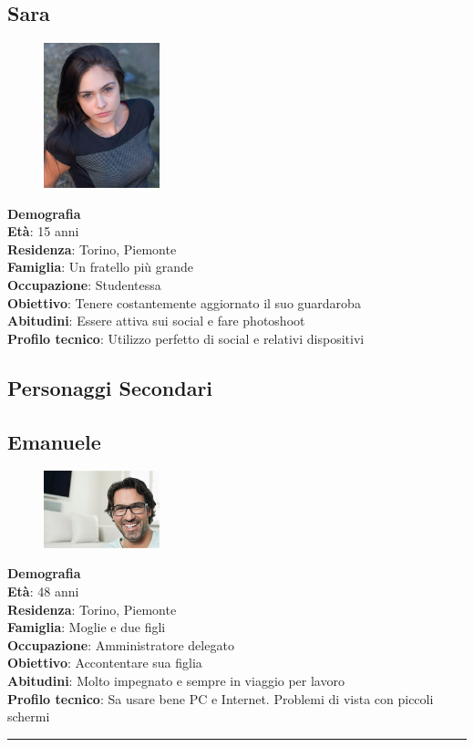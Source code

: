 \documentclass[12pt,a4paper]{report}
\begin{document}
\subsection*{Sara}
\begin{figure}
  \centering
  \includegraphics[width=0.3\textwidth]{"Images Latex/Personas/Sara"}
\end{figure}
\textbf{Demografia}\\
\indent\textbf{Età}: 15 anni\\
\indent\textbf{Residenza}: Torino, Piemonte\\
\indent\textbf{Famiglia}: Un fratello più grande\\
\indent\textbf{Occupazione}: Studentessa\\
\textbf{Obiettivo}: Tenere costantemente aggiornato il suo guardaroba\\
\textbf{Abitudini}: Essere attiva sui social e fare photoshoot\\
\textbf{Profilo tecnico}: Utilizzo perfetto di social e relativi dispositivi\\

\subsection{Personaggi Secondari}
\subsection*{Emanuele}
\begin{figure}
  \centering
    \includegraphics[width=0.3\textwidth]{"Images Latex/Personas/Emanuele"}
\end{figure}
\textbf{Demografia}\\
\indent \textbf{Età}: 48 anni\\
\indent \textbf{Residenza}: Torino, Piemonte\\
\indent \textbf{Famiglia}: Moglie e due figli\\
\indent \textbf{Occupazione}: Amministratore delegato\\
\textbf{Obiettivo}: Accontentare sua figlia\\
\textbf{Abitudini}: Molto impegnato e sempre in viaggio per lavoro\\
\textbf{Profilo tecnico}: Sa usare bene PC e Internet. Problemi di vista con piccoli schermi\\
\rule{\textwidth}{0.5pt}
\newpage
\end{document}
